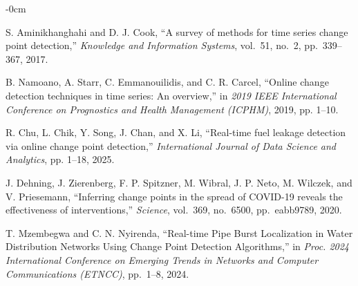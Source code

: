 \documentclass[journal,article,submit,pdftex,moreauthors]{Definitions/mdpi}
\begin{document}
\begin{adjustwidth}{-\extralength}{0cm}



% 


\begin{thebibliography}{999}

S. Aminikhanghahi and D. J. Cook,
``A survey of methods for time series change point detection,''
\textit{Knowledge and Information Systems}, vol.~51, no.~2, pp.~339--367, 2017.

B. Namoano, A. Starr, C. Emmanouilidis, and C. R. Carcel, ``Online change detection techniques in time series: An overview,'' in \emph{2019 IEEE International Conference on Prognostics and Health Management (ICPHM)}, 2019, pp. 1--10.

R. Chu, L. Chik, Y. Song, J. Chan, and X. Li, ``Real-time fuel leakage detection via online change point detection,'' \emph{International Journal of Data Science and Analytics}, pp. 1--18, 2025.

J. Dehning, J. Zierenberg, F. P. Spitzner, M. Wibral, J. P. Neto, M. Wilczek, and V. Priesemann,
``Inferring change points in the spread of COVID-19 reveals the effectiveness of interventions,''
\textit{Science}, vol.~369, no.~6500, pp.~eabb9789, 2020.

T. Mzembegwa and C. N. Nyirenda,
``Real-time Pipe Burst Localization in Water Distribution Networks Using Change Point Detection Algorithms,''
in \textit{Proc. 2024 International Conference on Emerging Trends in Networks and Computer Communications (ETNCC)}, pp.~1--8, 2024.


\end{thebibliography}
\end{adjustwidth}
\end{document}
